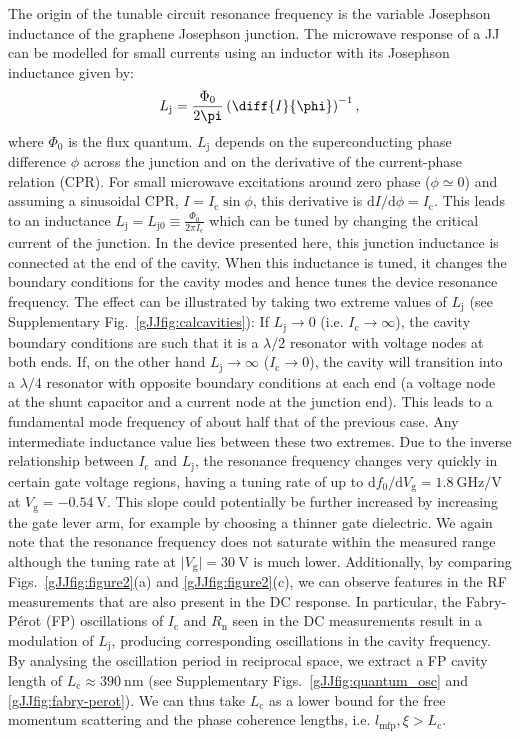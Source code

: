 The origin of the tunable circuit resonance frequency is the variable Josephson inductance of the graphene Josephson junction.
The microwave response of a JJ can be modelled for small currents using an inductor with its Josephson inductance given by:
\begin{equation}
L_\text{j} = \frac{\Phi_0}{2\pi} \left(\diff{I}{\phi}\right)^{-1}, \label{eq:Lj}
\end{equation}
where $\Phi_0$ is the flux quantum.
$L_\text{j}$ depends on the superconducting phase difference $\phi$ across the junction and on the derivative of the current-phase relation (CPR).
For small microwave excitations around zero phase ($\phi\simeq 0$) and assuming a sinusoidal CPR, $I=I_\text{c}\sin\phi$, this derivative is $\text{d}I/\text{d}\phi = I_\text{c}$.
This leads to an inductance $L_\text{j} = L_{\text{j}0} \equiv \frac{\Phi_0}{2\pi I_\text{c}}$ which can be tuned by changing the critical current of the junction.
In the device presented here, this junction inductance is connected at the end of the cavity.
When this inductance is tuned, it changes the boundary conditions for the cavity modes and hence tunes the device resonance frequency.
The effect can be illustrated by taking two extreme values of $L_\text{j}$ (see Supplementary Fig.~\ref{gJJfig:calcavities}):
If $L_\text{j}\rightarrow 0$ (i.e. $I_\text{c}\rightarrow\infty$), the cavity boundary conditions are such that it is a $\lambda/2$ resonator with voltage nodes at both ends.
If, on the other hand $L_\text{j}\rightarrow \infty$ ($I_\text{c}\rightarrow 0$), the cavity will transition into a $\lambda/4$ resonator with opposite boundary conditions at each end (a voltage node at the shunt capacitor and a current node at the junction end).
This leads to a fundamental mode frequency of about half that of the previous case.
Any intermediate inductance value lies between these two extremes.
Due to the inverse relationship between $I_\text{c}$ and $L_\text{j}$, the resonance frequency changes very quickly in certain gate voltage regions, having a tuning rate of up to $\text{d}f_0/\text{d}V_\text{g}=\SI{1.8}{\giga\hertz\per\volt}$ at $V_\text{g}=\SI{-0.54}{\volt}$.
This slope could potentially be further increased by increasing the gate lever arm, for example by choosing a thinner gate dielectric.
We again note that the resonance frequency does not saturate within the measured range although the tuning rate at $\vert V_\text{g} \rvert=\SI{30}{\volt}$ is much lower.
Additionally, by comparing Figs.~\ref{gJJfig:figure2}(a) and \ref{gJJfig:figure2}(c), we can observe features in the RF measurements that are also present in the DC response.
In particular, the Fabry-P\'erot (FP) oscillations of $I_\text{c}$ and $R_\text{n}$ seen in the DC measurements result in a modulation of $L_\text{j}$, producing corresponding oscillations in the cavity frequency.
By analysing the oscillation period in reciprocal space, we extract a FP cavity length of $L_\text{c}\approx \SI{390}{\nano\meter}$ (see Supplementary Figs.~\ref{gJJfig:quantum_osc} and \ref{gJJfig:fabry-perot}).
We can thus take $L_\text{c}$ as a lower bound for the free momentum scattering and the phase coherence lengths, i.e. $l_\text{mfp},\xi>L_\text{c}$.


